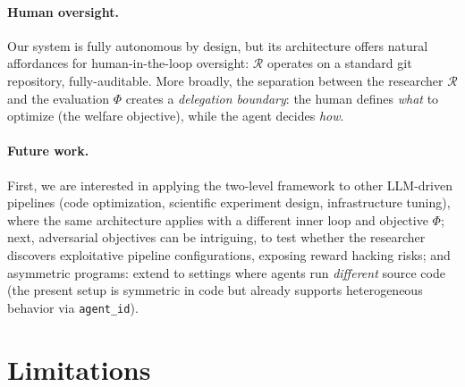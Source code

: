 \documentclass{article}
\newcommand{\cR}{\mathcal{R}}
\newcommand{\bm}{\mathbf{m}}
\begin{document}
\paragraph{Human oversight.}
Our system is fully autonomous by design, but its architecture offers natural affordances for human-in-the-loop oversight: $\cR$ operates on a standard git repository, fully-auditable.
More broadly, the separation between the researcher $\cR$ and the evaluation $\Phi$ creates a \emph{delegation boundary}: the human defines \emph{what} to optimize (the welfare objective), while the agent decides \emph{how}. %


\paragraph{Future work.}
First, we are interested in applying the two-level framework to other LLM-driven pipelines (code optimization, scientific experiment design, infrastructure tuning), where the same architecture applies with a different inner loop and objective $\Phi$; next, adversarial objectives can be intriguing, to test whether the researcher discovers exploitative pipeline configurations, exposing reward hacking risks; and asymmetric programs: extend to settings where agents run \emph{different} source code (the present setup is symmetric in code but already supports heterogeneous behavior via \texttt{agent\_id}).





\appendix

\section{Limitations}
\label{sec:limitations}
\end{document}
